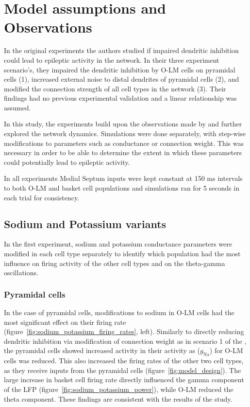 \section{Model assumptions and Observations}
In the original experiments \textcite{sanjayImpairedDendriticInhibition2015} the authors studied if impaired dendritic
inhibition could lead to epileptic activity in the network.
In their three experiment scenario's, they impaired the dendritic inhibition by O-LM cells on pyramidal cells (1), increased external noise to distal
dendrites of pyramidal cells (2), and modified the connection strength of all cell types in the network (3).
Their findings had no previous experimental validation and a linear relationship was assumed.

In this study, the experiments build upon the observations made by \textcite{sanjayImpairedDendriticInhibition2015} and further explored the network dynamics.
Simulations were done separately, with step-wise modifications to parameters such as conductance or connection weight.
This was necessary in order to be able to determine the extent in which these parameters could potentially lead to epileptic activity.

In all experiments Medial Septum inputs were kept constant at 150 ms intervals to both O-LM and basket cell populations
and simulations ran for 5 seconds in each trial for consistency.

\subsection{Sodium and Potassium variants}
In the first experiment, sodium and potassium conductance parameters were modified
in each cell type separately to identify which population had the most influence
on firing activity of the other cell types and on the theta-gamma oscillations.

\subsubsection{Pyramidal cells}
In the case of pyramidal cells, modifications to sodium in O-LM cells had the most
significant effect on their firing rate (figure~\ref{fig:sodium_potassium_firing_rates}, left). Similarly to directly
reducing dendritic inhibition via modification of connection weight as in scenario 1 of the \textcite{sanjayImpairedDendriticInhibition2015},
the pyramidal cells showed increased activity in their activity as (\(g_{\text{Na}}\)) for O-LM cells was reduced.
This also increased the firing rates of the other two cell types, as they receive inputs from the
pyramidal cells (figure~\ref{fig:model_design}). The large increase in basket cell firing rate directly influenced
the gamma component of the LFP (figure~\ref{fig:sodium_potassium_power}), while O-LM reduced the theta component.
These findings are consistent with the results of the \textcite{sanjayImpairedDendriticInhibition2015} study.


